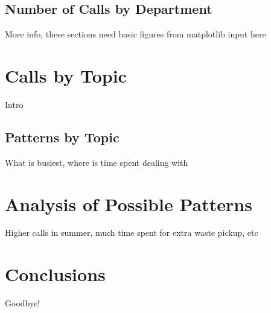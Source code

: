 \documentclass[11pt,twocolumn]{article}
\begin{document}
\subsection{Number of Calls by Department}
More info, these sections need basic figures from matplotlib input here

\section{Calls by Topic}
Intro
\subsection{Patterns by Topic}
What is busiest, where is time spent dealing with 

\section{Analysis of Possible Patterns}
Higher calls in summer, much time spent for extra waste pickup, etc

\section{Conclusions}

Goodbye!
\end{document}
